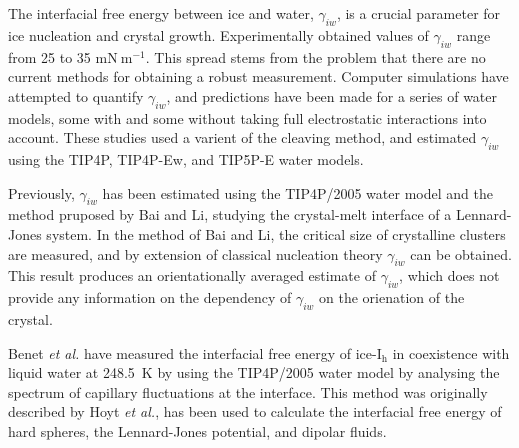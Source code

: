 
The interfacial free energy between ice and
water, $\gamma_{iw}$, is a crucial parameter for ice nucleation and
crystal growth.\cite{1,2} Experimentally obtained values of
$\gamma_{iw}$ range from 25 to 35
$\mathrm{mN}~\mathrm{m}^{-1}$.\cite{1} This spread stems from the
problem that there are no current methods for obtaining a robust
measurement. Computer simulations have attempted to quantify
$\gamma_{iw}$, and predictions have been made for a series of water
models, some with\cite{4} and some without\cite{5} taking full
electrostatic interactions into account. These studies used a varient
of the cleaving method,\cite{6} and estimated $\gamma_{iw}$ using the
TIP4P, TIP4P-Ew, and TIP5P-E water models.

Previously, $\gamma_{iw}$ has been estimated using the TIP4P/2005
water model and the method pruposed by Bai and Li, studying the
crystal-melt interface of a Lennard-Jones system.\cite{10} In the
method of Bai and Li, the critical size of crystalline clusters are
measured, and by extension of classical nucleation theory
$\gamma_{iw}$ can be obtained.\cite{11,12} This result produces an
orientationally averaged estimate of $\gamma_{iw}$, which does not
provide any information on the dependency of $\gamma_{iw}$ on the
orienation of the crystal.

Benet \textit{et al.} have measured the interfacial free energy of
ice-I$_\mathrm{h}$ in coexistence with liquid water at 248.5~K by
using the TIP4P/2005 water model by analysing the spectrum of
capillary fluctuations at the interface.\cite{Benet2014} This method
was originally described by Hoyt \textit{et al.}\cite{Hoyt2001}, has
been used to calculate the interfacial free energy of hard
spheres,\cite{14} the Lennard-Jones potential,\cite{15} and dipolar
fluids.\cite{16}


